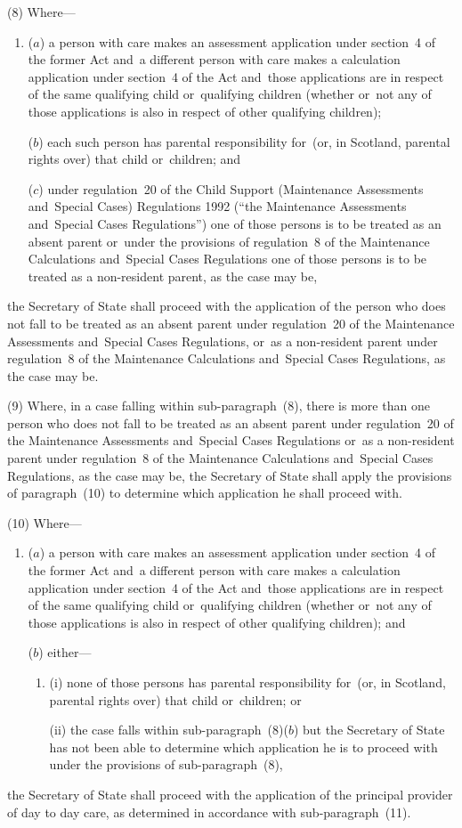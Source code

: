 \documentclass[12pt,a4paper]{article}
\begin{document}
(8) Where—
\begin{enumerate}\item[]
($a$) a person with care makes an assessment application under section~4 of the former Act and~a different person with care makes a calculation application under section~4 of the Act and~those applications are in respect of the same qualifying child or~qualifying children (whether or~not any of those applications is also in respect of other qualifying children);

($b$) each such person has parental responsibility for~(or, in Scotland, parental rights over) that child or~children; and

($c$) under regulation~20 of the Child Support (Maintenance Assessments and~Special Cases) Regulations 1992 (“the Maintenance Assessments and~Special Cases Regulations”) one of those persons is to be treated as an absent parent or~under the provisions of regulation~8 of the Maintenance Calculations and~Special Cases Regulations one of those persons is to be treated as a non-resident parent, as the case may be,
\end{enumerate}
the Secretary of State shall proceed with the application of the person who does not fall to be treated as an absent parent under regulation~20 of the Maintenance Assessments and~Special Cases Regulations, or~as a non-resident parent under regulation~8 of the Maintenance Calculations and~Special Cases Regulations, as the case may be.

(9) Where, in a case falling within sub-paragraph~(8), there is more than one person who does not fall to be treated as an absent parent under regulation~20 of the Maintenance Assessments and~Special Cases Regulations or~as a non-resident parent under regulation~8 of the Maintenance Calculations and~Special Cases Regulations, as the case may be, the Secretary of State shall apply the provisions of paragraph~(10) to determine which application he shall proceed with.

(10) Where—
\begin{enumerate}\item[]
($a$) a person with care makes an assessment application under section~4 of the former Act and~a different person with care makes a calculation application under section~4 of the Act and~those applications are in respect of the same qualifying child or~qualifying children (whether or~not any of those applications is also in respect of other qualifying children); and

($b$) either—
\begin{enumerate}\item[]
(i) none of those persons has parental responsibility for~(or, in Scotland, parental rights over) that child or~children; or

(ii) the case falls within sub-paragraph~(8)($b$)  but the Secretary of State has not been able to determine which application he is to proceed with under the provisions of sub-paragraph~(8),
\end{enumerate}
\end{enumerate}
the Secretary of State shall proceed with the application of the principal provider of day to day care, as determined in accordance with sub-paragraph~(11).
\end{document}
